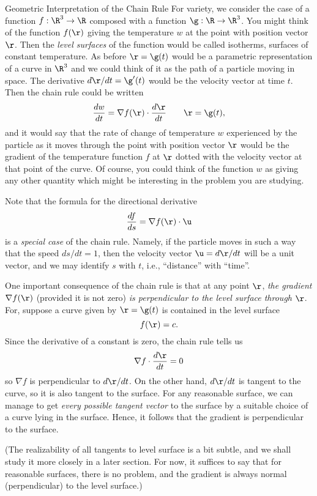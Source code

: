 \subhead Geometric Interpretation of the Chain Rule \endsubhead
For variety, we consider the case of a function $f:\R^3 \to \R$
composed with a function $\g:\R \to \R^3$.   You might think of
the function $f(\r)$ giving the temperature $w$ at the point with
position vector $\r$.  Then the {\it level surfaces\/} of the
function would be called isotherms, surfaces of constant temperature.
As before $\r = \g(t)$ would be a parametric representation of
a curve in $\R^3$ and we could think of it as the path of a
particle moving in space.  The derivative $d\r/dt = \g'(t)$
would be the velocity vector at time $t$.  Then the chain rule
could be written
$$
   \frac{dw}{dt} = \nabla f(\r)\cdot \frac{d\r}{dt}
\qquad  \r = \g(t),
$$
%
and it would say that the rate of change of temperature $w$
experienced by the particle as it moves through the point
with position vector $\r$ would be the gradient of the temperature
function $f$ at $\r$ dotted with the velocity vector at that
point of the curve.  Of course, you could think of the function
$w$ as giving any other quantity which might be interesting
in the problem you are studying.

Note that the formula for the directional derivative
$$
   \frac{df}{ds} = \nabla f(\r)\cdot \u
$$
is a {\it special case\/} of the chain rule.  Namely, if the
particle moves in such a way that the speed $ds/dt = 1$, then
the velocity vector $\u = d\r/dt$ will be a unit vector, and
we may identify $s$ with $t$, i.e., ``distance'' with ``time''.
  
One important consequence
of the chain rule is that at any point $\r$,
 {\it the gradient\/} $\nabla f(\r)$ (provided it is not zero) {\it  is 
perpendicular to the level surface through\/} $\r$. 
For, suppose a curve given by $\r = \g(t)$ is contained in
the level surface 
$$
   f(\r) = c.
$$
Since the derivative of a constant is zero, the chain rule tells
us
$$ 
   \nabla f\cdot\frac{d\r}{dt} = 0
$$
so $\nabla f$ is perpendicular to $d\r/dt$.
On the other hand, $d\r/dt$ is tangent to the curve, so it is
also tangent to the surface.  For any reasonable
surface, we  
can manage to get {\it every possible tangent vector\/} to the surface
by a suitable choice of a curve lying in the surface.  Hence,
it follows that the gradient is perpendicular to the surface.
\medskip
\centerline{}
\medskip
(The realizability of all tangents  to level surface is
a bit subtle, and we shall study it more closely in a later
section.  For now, it suffices to say that for reasonable surfaces,
there is no problem, and the gradient is always normal (perpendicular)
to the level surface.)
%
%

